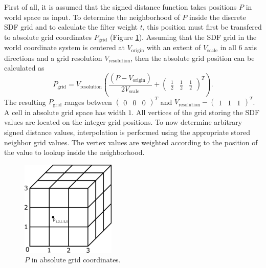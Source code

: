 \documentclass[12pt]{article}
\begin{document}
First of all, it is assumed that the signed distance function takes positions $P$ in world space as input. To determine the neighborhood of $P$ inside the discrete SDF grid and to calculate the filter weight $t$, this position must first be transfered to absolute grid coordinates $P_{\text{grid}}$ (Figure \ref{fig:absgridcoords}). Assuming that the SDF grid in the world coordinate system is centered at $V_{\text{origin}}$ with an extent of $V_{\text{scale}}$ in all 6 axis directions and a grid resolution $V_{\text{resolution}}$, then the absolute grid position can be calculated as
\begin{equation}
P_{\text{grid}} = V_{\text{resolution}} \left(\frac{\left(P - V_{\text{origin}}\right)}{2V_{\text{scale}}}  + \begin{pmatrix}\frac{1}{2} & \frac{1}{2} & \frac{1}{2}\end{pmatrix}^T \right) 
.\end{equation}
The resulting $P_{\text{grid}}$ ranges between $\begin{pmatrix} 0 & 0 & 0\end{pmatrix}^T$ and $V_{\text{resolution}} - \begin{pmatrix} 1 & 1 & 1\end{pmatrix}^T$. A cell in absolute grid space has width $1$. All vertices of the grid storing the SDF values are located on the integer grid positions. To now determine arbitrary signed distance values, interpolation is performed using the appropriate stored neighbor grid values. The vertex values are weighted according to the position of the value to lookup inside the neighborhood. 
\begin{figure}[h]
	\centering
	\includegraphics[width=0.4\textwidth]{images/absolute_grid_coords}
	\caption{$P$ in absolute grid coordinates.}
	\label{fig:absgridcoords}
\end{figure}
\end{document}
